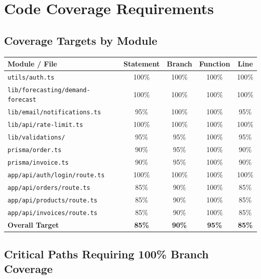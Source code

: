 \documentclass[12pt,a4paper]{report}
\begin{document}
\chapter{Code Coverage Requirements}

\section{Coverage Targets by Module}

\begin{center}
\begin{tabular}{lcccc}
  \toprule
  \textbf{Module / File} & \textbf{Statement} & \textbf{Branch} & \textbf{Function} & \textbf{Line} \\
  \midrule
  \texttt{utils/auth.ts}                  & 100\% & 100\% & 100\% & 100\% \\
  \texttt{lib/forecasting/demand-forecast} & 100\% & 100\% & 100\% & 100\% \\
  \texttt{lib/email/notifications.ts}      &  95\% & 100\% & 100\% &  95\% \\
  \texttt{lib/api/rate-limit.ts}           & 100\% & 100\% & 100\% & 100\% \\
  \texttt{lib/validations/}               &  95\% &  95\% & 100\% &  95\% \\
  \texttt{prisma/order.ts}                &  90\% &  95\% & 100\% &  90\% \\
  \texttt{prisma/invoice.ts}              &  90\% &  95\% & 100\% &  90\% \\
  \texttt{app/api/auth/login/route.ts}    & 100\% & 100\% & 100\% & 100\% \\
  \texttt{app/api/orders/route.ts}        &  85\% &  90\% & 100\% &  85\% \\
  \texttt{app/api/products/route.ts}      &  85\% &  90\% & 100\% &  85\% \\
  \texttt{app/api/invoices/route.ts}      &  85\% &  90\% & 100\% &  85\% \\
  \midrule
  \textbf{Overall Target}                 & \textbf{85\%} & \textbf{90\%} & \textbf{95\%} & \textbf{85\%} \\
  \bottomrule
\end{tabular}
\end{center}

\section{Critical Paths Requiring 100\% Branch Coverage}
\end{document}
